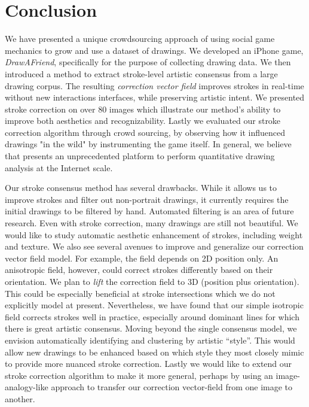 \section{Conclusion}

We have presented a unique crowdsourcing approach of using social game mechanics to grow and use a dataset of drawings. We developed an iPhone game, \emph{DrawAFriend}, specifically for the purpose of
collecting drawing data. We then introduced a method to extract
stroke-level artistic consensus from a large drawing corpus. The
resulting \emph{correction vector field} improves strokes in
real-time without new interactions interfaces, while preserving artistic
intent. We presented stroke correction on over 80 images which illustrate our method's ability to improve both
aesthetics and recognizability. Lastly we evaluated our stroke correction algorithm through crowd sourcing, by observing how it influenced drawings "in the wild" by instrumenting the game itself. In general, we believe that \daf presents an unprecedented platform to perform quantitative drawing analysis at the Internet scale.

Our stroke consensus method has several drawbacks. While it allows us to improve strokes and filter out non-portrait drawings, it currently requires the initial drawings to be filtered by hand. Automated filtering is an area of future research. Even with stroke
correction, many drawings are still not beautiful. We would like to
study automatic aesthetic enhancement of strokes, including weight
and texture. We also see several avenues to improve and generalize
our correction vector field model. For example, the field depends on
2D position only. An anisotropic field, however, could correct strokes
differently based on their orientation. We plan to {\em lift} the correction field to
3D (position plus orientation). This could be especially
beneficial at stroke intersections which we do not explicitly model
at present. Nevertheless, we have found that our simple isotropic
field corrects strokes well in practice, especially
around dominant lines for which there is great artistic consensus.
Moving beyond the single consensus model, we envision automatically
identifying and clustering by artistic ``style''. This would allow new drawings to
be enhanced based on which style they most closely mimic to provide more
nuanced stroke correction. Lastly we would like to extend our stroke correction algorithm to make it more general, perhaps by using an image-analogy-like approach to transfer our correction vector-field from one image to another.

